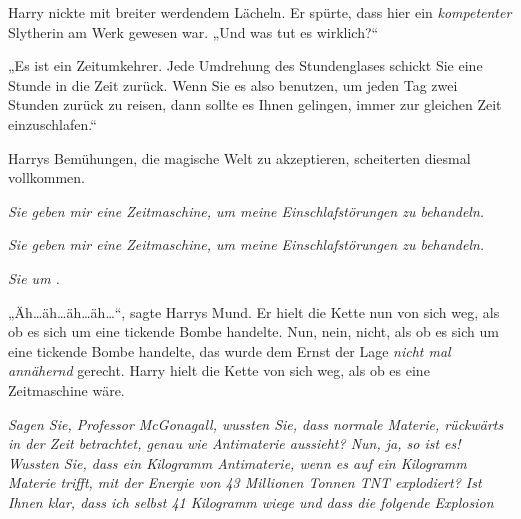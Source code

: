 Harry nickte mit breiter werdendem Lächeln. Er spürte, dass hier ein \emph{kompetenter} Slytherin am Werk gewesen war. „Und was tut es wirklich?“

„Es ist ein Zeitumkehrer. Jede Umdrehung des Stundenglases schickt Sie eine Stunde in die Zeit zurück. Wenn Sie es also benutzen, um jeden Tag zwei Stunden zurück zu reisen, dann sollte es Ihnen gelingen, immer zur gleichen Zeit einzuschlafen.“

Harrys Bemühungen, die magische Welt zu akzeptieren, scheiterten diesmal vollkommen.

\emph{Sie geben mir eine Zeitmaschine, um meine Einschlafstörungen zu behandeln.}

\emph{Sie geben mir eine \emph{Zeitmaschine}, um meine \emph{Einschlafstörungen} zu behandeln.}

\emph{Sie  um .}

„Äh…äh…äh…äh…“, sagte Harrys Mund. Er hielt die Kette nun von sich weg, als ob es sich um eine tickende Bombe handelte. Nun, nein, nicht, als ob es sich um eine tickende Bombe handelte, das wurde dem Ernst der Lage \emph{nicht mal annähernd} gerecht. Harry hielt die Kette von sich weg, als ob es eine Zeitmaschine wäre.

\emph{Sagen Sie, Professor McGonagall, wussten Sie, dass normale Materie, rückwärts in der Zeit betrachtet, genau wie Antimaterie aussieht? Nun, ja, so ist es! Wussten Sie, dass ein Kilogramm Antimaterie, wenn es auf ein Kilogramm Materie trifft, mit der Energie von 43 Millionen Tonnen TNT explodiert? Ist Ihnen klar, dass ich selbst 41 Kilogramm wiege und dass die folgende Explosion }

